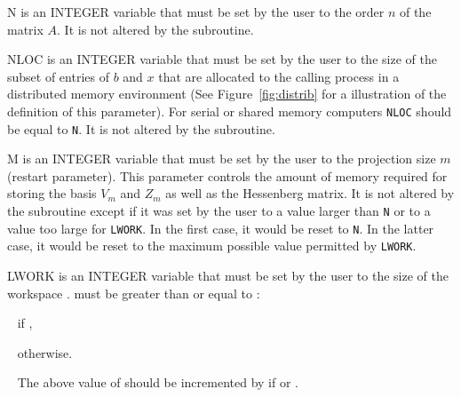 \begin{listparam}
 \item[N]       is an {INTEGER} variable that must be set by the user to
                the order $n$ of the matrix $A$.
                It is not altered by the subroutine.
 \item[NLOC]    is an {INTEGER} variable that must be set by the user to
                the size of the subset of entries of $b$ and $x$ that are
                allocated to the calling process in a distributed memory
                environment (See Figure~\ref{fig:distrib} for a illustration of the
                definition of this parameter).
                For serial or shared memory computers \texttt{NLOC} should be
                equal to \texttt{N}.
                It is not altered by the subroutine.
 \item[M]       is an {INTEGER} variable that must be set by the user to
                the projection size $m$ (restart parameter).
                This parameter controls the amount of memory required for
                storing the basis $V_m$ and $Z_m$  as well as the Hessenberg matrix.
                It is not altered by the subroutine except if it was set by the
                user to a value larger than \texttt{N} or to a value too large
                for \texttt{LWORK}.
                In the first case, it would be reset to  \texttt{N}.
                In the latter case, it would be reset to the
                maximum possible value  permitted by \texttt{LWORK}. 
 \item[LWORK]   is an INTEGER variable that must be set by the user to the
                size of the workspace . 
                 must be greater than or equal to :  
 \item[~]       \hspace*{0.5cm} if ,
 \item[~]       \hspace*{0.5cm}  otherwise.
 \item[~]       \hspace*{0.5cm}The above value of  should be incremented by  if 
                or .

\end{listparam}
